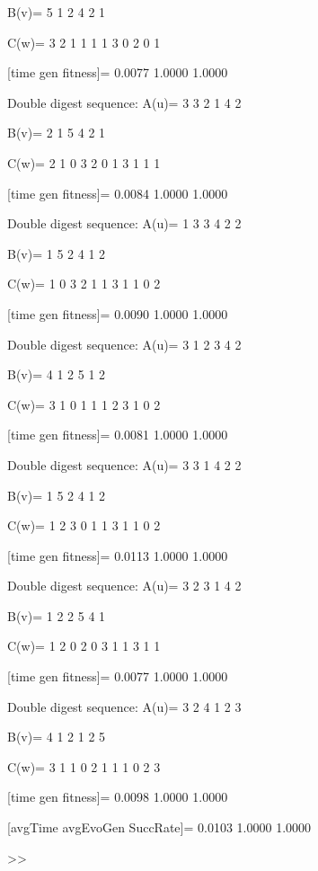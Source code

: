 B(v)=
     5     1     2     4     2     1

C(w)=
     3     2     1     1     1     1     3     0     2     0     1

[time gen fitness]=
    0.0077    1.0000    1.0000

Double digest sequence:
A(u)=
     3     3     2     1     4     2

B(v)=
     2     1     5     4     2     1

C(w)=
     2     1     0     3     2     0     1     3     1     1     1

[time gen fitness]=
    0.0084    1.0000    1.0000

Double digest sequence:
A(u)=
     1     3     3     4     2     2

B(v)=
     1     5     2     4     1     2

C(w)=
     1     0     3     2     1     1     3     1     1     0     2

[time gen fitness]=
    0.0090    1.0000    1.0000

Double digest sequence:
A(u)=
     3     1     2     3     4     2

B(v)=
     4     1     2     5     1     2

C(w)=
     3     1     0     1     1     1     2     3     1     0     2

[time gen fitness]=
    0.0081    1.0000    1.0000

Double digest sequence:
A(u)=
     3     3     1     4     2     2

B(v)=
     1     5     2     4     1     2

C(w)=
     1     2     3     0     1     1     3     1     1     0     2

[time gen fitness]=
    0.0113    1.0000    1.0000

Double digest sequence:
A(u)=
     3     2     3     1     4     2

B(v)=
     1     2     2     5     4     1

C(w)=
     1     2     0     2     0     3     1     1     3     1     1

[time gen fitness]=
    0.0077    1.0000    1.0000

Double digest sequence:
A(u)=
     3     2     4     1     2     3

B(v)=
     4     1     2     1     2     5

C(w)=
     3     1     1     0     2     1     1     1     0     2     3

[time gen fitness]=
    0.0098    1.0000    1.0000

[avgTime  avgEvoGen  SuccRate]=
    0.0103    1.0000    1.0000

>> 
